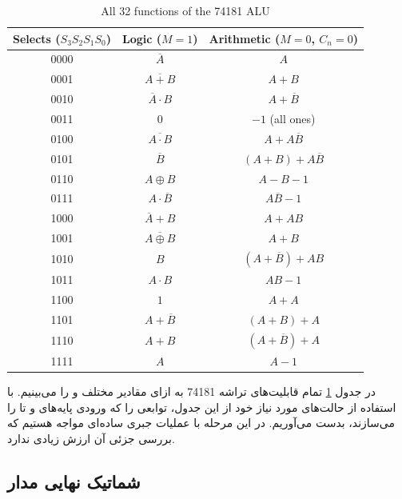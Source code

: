 \documentclass[a4paper,12pt]{article}
\numberwithin{figure}{subsection}
\begin{document}
\begin{latin}
\begin{table}[h!]
\centering
\caption{All 32 functions of the 74181 ALU}
\label{tab:74181_functions}
\renewcommand{\arraystretch}{1.3}
\begin{tabular}{c | c | c}
\hline
\textbf{Selects ($S_3 S_2 S_1 S_0$)} & \textbf{Logic ($M=1$)} & \textbf{Arithmetic ($M=0$, $C_n=0$)} \\
\hline
0000 & $\overline{A}$ & $A$ \\
0001 & $\overline{A+B}$ & $A+B$ \\
0010 & $\overline{A} \cdot B$ & $A+\overline{B}$ \\
0011 & $0$ & $-1$ (all ones) \\
0100 & $\overline{A \cdot B}$ & $A + A\overline{B}$ \\
0101 & $\overline{B}$ & $(A+B) + A\overline{B}$ \\
0110 & $A \oplus B$ & $A - B - 1$ \\
0111 & $A \cdot \overline{B}$ & $A\overline{B} - 1$ \\
1000 & $\overline{A} + B$ & $A + AB$ \\
1001 & $\overline{A \oplus B}$ & $A+B$ \\
1010 & $B$ & $(A+\overline{B}) + AB$ \\
1011 & $A \cdot B$ & $AB - 1$ \\
1100 & $1$ & $A + A$ \\
1101 & $A + \overline{B}$ & $(A+B) + A$ \\
1110 & $A + B$ & $(A+\overline{B}) + A$ \\
1111 & $A$ & $A - 1$ \\
\hline
\end{tabular}
\end{table}
\end{latin}

در جدول \ref{tab:74181_functions} تمام قابلیت‌های تراشه 74181 به ازای مقادیر مختلف  و  را می‌بینیم. با استفاده از حالت‌های مورد نیاز خود از این جدول، توابعی را که ورودی پایه‌های  و  تا  را می‌سازند، بدست می‌آوریم. در این مرحله با عملیات جبری ساده‌ای مواجه هستیم که بررسی جزئی آن ارزش زیادی ندارد.


\subsection{شماتیک نهایی مدار}
\leavevmode\par
\vspace{0.3cm}
\end{document}
